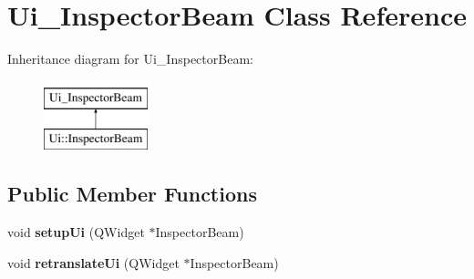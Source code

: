 \hypertarget{class_ui___inspector_beam}{}\section{Ui\+\_\+\+Inspector\+Beam Class Reference}
\label{class_ui___inspector_beam}
Inheritance diagram for Ui\+\_\+\+Inspector\+Beam\+:\begin{figure}[H]
\begin{center}
\leavevmode
\includegraphics[height=2.000000cm]{class_ui___inspector_beam}
\end{center}
\end{figure}
\subsection*{Public Member Functions}
\begin{DoxyCompactItemize}
\item 
\mbox{\label{class_ui___inspector_beam_a9b6f15f93371d2aa0c013e4ca5dd76e1}} 
void {\bfseries setup\+Ui} (Q\+Widget $\ast$Inspector\+Beam)
\item 
\mbox{\label{class_ui___inspector_beam_a7e1ff17f7c214fcff8e2db5610857b7a}} 
void {\bfseries retranslate\+Ui} (Q\+Widget $\ast$Inspector\+Beam)
\end{DoxyCompactItemize}
